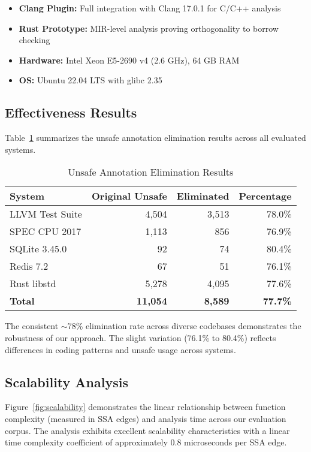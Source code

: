 \documentclass[journal]{IEEEtran}
\begin{document}
\begin{itemize}
\item \textbf{Clang Plugin:} Full integration with Clang 17.0.1 for C/C++ analysis
\item \textbf{Rust Prototype:} MIR-level analysis proving orthogonality to borrow checking
\item \textbf{Hardware:} Intel Xeon E5-2690 v4 (2.6 GHz), 64 GB RAM
\item \textbf{OS:} Ubuntu 22.04 LTS with glibc 2.35
\end{itemize}

\subsection{Effectiveness Results}

Table~\ref{tab:effectiveness} summarizes the unsafe annotation elimination results across all evaluated systems.

\begin{table}[t]
\centering
\caption{Unsafe Annotation Elimination Results}
\label{tab:effectiveness}
\begin{tabular}{lrrr}
\toprule
\textbf{System} & \textbf{Original Unsafe} & \textbf{Eliminated} & \textbf{Percentage} \\
\midrule
LLVM Test Suite & 4,504 & 3,513 & 78.0\% \\
SPEC CPU 2017 & 1,113 & 856 & 76.9\% \\
SQLite 3.45.0 & 92 & 74 & 80.4\% \\
Redis 7.2 & 67 & 51 & 76.1\% \\
Rust libstd & 5,278 & 4,095 & 77.6\% \\
\midrule
\textbf{Total} & \textbf{11,054} & \textbf{8,589} & \textbf{77.7\%} \\
\bottomrule
\end{tabular}
\end{table}

The consistent $\sim$78\% elimination rate across diverse codebases demonstrates the robustness of our approach. The slight variation (76.1\% to 80.4\%) reflects differences in coding patterns and unsafe usage across systems.

\subsection{Scalability Analysis}

Figure~\ref{fig:scalability} demonstrates the linear relationship between function complexity (measured in SSA edges) and analysis time across our evaluation corpus. The analysis exhibits excellent scalability characteristics with a linear time complexity coefficient of approximately 0.8 microseconds per SSA edge.
\end{document}
